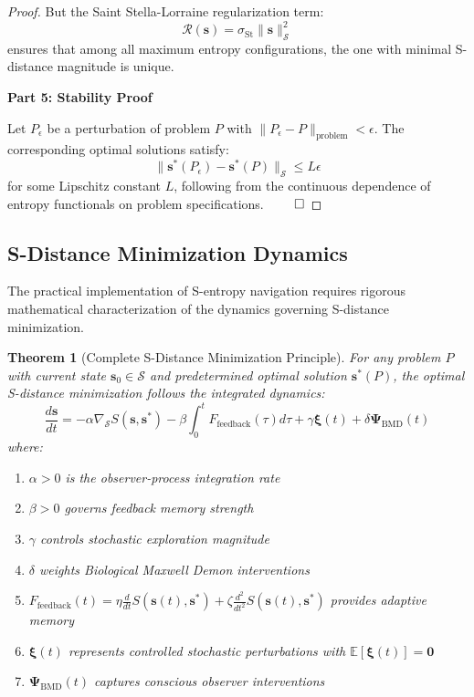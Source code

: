 \documentclass[11pt]{article}
\newtheorem{theorem}{Theorem}[section]
\theoremstyle{definition}
\theoremstyle{remark}
\newcommand{\Expectation}{\mathbb{E}}
\newcommand{\SEntropy}{\mathcal{S}}
\newcommand{\StellasConstant}{\sigma_{\text{St}}}
\begin{document}
\begin{proof}
But the Saint Stella-Lorraine regularization term:
\begin{equation}
\mathcal{R}(\mathbf{s}) = \StellasConstant \|\mathbf{s}\|_{\SEntropy}^2
\end{equation}
ensures that among all maximum entropy configurations, the one with minimal S-distance magnitude is unique.

\textbf{Part 5: Stability Proof}

Let $P_{\epsilon}$ be a perturbation of problem $P$ with $\|P_{\epsilon} - P\|_{\text{problem}} < \epsilon$. The corresponding optimal solutions satisfy:
\begin{equation}
\|\mathbf{s}^*(P_{\epsilon}) - \mathbf{s}^*(P)\|_{\SEntropy} \leq L \epsilon
\end{equation}
for some Lipschitz constant $L$, following from the continuous dependence of entropy functionals on problem specifications. $\qed$
\end{proof}

\subsection{S-Distance Minimization Dynamics}

The practical implementation of S-entropy navigation requires rigorous mathematical characterization of the dynamics governing S-distance minimization.

\begin{theorem}[Complete S-Distance Minimization Principle]
\label{thm:s_minimization_complete}
For any problem $P$ with current state $\mathbf{s}_0 \in \SEntropy$ and predetermined optimal solution $\mathbf{s}^*(P)$, the optimal S-distance minimization follows the integrated dynamics:
\begin{equation}
\frac{d\mathbf{s}}{dt} = -\alpha \nabla_{\SEntropy} S(\mathbf{s}, \mathbf{s}^*) - \beta \int_0^t F_{\text{feedback}}(\tau) d\tau + \gamma \mathbf{\xi}(t) + \delta \mathbf{\Psi}_{\text{BMD}}(t)
\label{eq:complete_s_dynamics}
\end{equation}
where:
\begin{enumerate}
\item $\alpha > 0$ is the observer-process integration rate
\item $\beta > 0$ governs feedback memory strength
\item $\gamma$ controls stochastic exploration magnitude
\item $\delta$ weights Biological Maxwell Demon interventions
\item $F_{\text{feedback}}(t) = \eta \frac{d}{dt} S(\mathbf{s}(t), \mathbf{s}^*) + \zeta \frac{d^2}{dt^2} S(\mathbf{s}(t), \mathbf{s}^*)$ provides adaptive memory
\item $\mathbf{\xi}(t)$ represents controlled stochastic perturbations with $\Expectation[\mathbf{\xi}(t)] = \mathbf{0}$
\item $\mathbf{\Psi}_{\text{BMD}}(t)$ captures conscious observer interventions
\end{enumerate}
\end{theorem}
\end{document}
